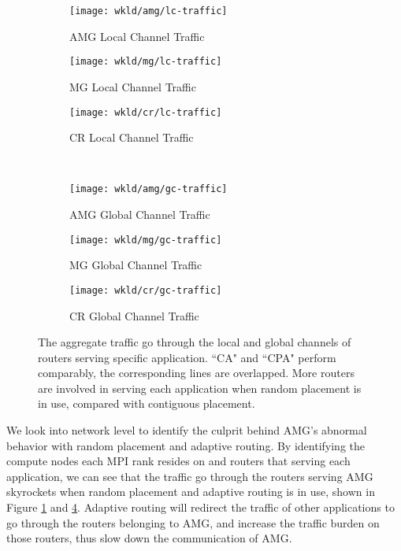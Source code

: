 \begin{figure*}[t]
    \centering
    \begin{subfigure}[t]{0.32\textwidth}
        \centering
        \texttt{[image: wkld/amg/lc-traffic]}
        \caption{AMG Local Channel Traffic}
        \label{fig:amg-lc-traffic}
    \end{subfigure}\hfill
    \hspace{1em}%
    \begin{subfigure}[t]{0.32\textwidth}
        \centering
        \texttt{[image: wkld/mg/lc-traffic]}
        \caption{MG Local Channel Traffic}
        \label{fig:mg-lc-traffic}
    \end{subfigure}\hfill
    \begin{subfigure}[t]{0.32\textwidth}
        \centering
        \texttt{[image: wkld/cr/lc-traffic]}
        \caption{CR Local Channel Traffic}
        \label{fig:cr-lc-traffic}
    \end{subfigure}\\
    \centering
    \begin{subfigure}[t]{0.32\textwidth}
        \centering
        \texttt{[image: wkld/amg/gc-traffic]}
        \caption{AMG Global Channel Traffic}
        \label{fig:amg-gc-traffic}
    \end{subfigure}\hfill
    \hspace{1em}%
    \begin{subfigure}[t]{0.32\textwidth}
        \centering
        \texttt{[image: wkld/mg/gc-traffic]}
        \caption{MG Global Channel Traffic}
        \label{fig:mg-gc-traffic}
    \end{subfigure}\hfill
    \begin{subfigure}[t]{0.32\textwidth}
        \centering
        \texttt{[image: wkld/cr/gc-traffic]}
        \caption{CR Global Channel Traffic}
        \label{fig:cr-gc-traffic}
    \end{subfigure}%
   \caption{The aggregate traffic go through the local and global channels of routers serving specific application. ``CA" and ``CPA" perform comparably, the corresponding lines are overlapped. More routers are involved in serving each application when random placement is in use, compared with contiguous placement.}
   \label{fig:3app-lc-gc-traffic}
\end{figure*}


We look into network level to identify the culprit behind AMG's abnormal behavior with random placement and adaptive routing. By identifying the compute nodes each MPI rank resides on and routers that serving each application, we can see that the traffic go through the routers serving AMG skyrockets when random placement and adaptive routing is in use, shown in Figure \ref{fig:amg-lc-traffic} and \ref{fig:amg-gc-traffic}. Adaptive routing will redirect the traffic of other applications to go through the routers belonging to AMG, and increase the traffic burden on those routers, thus slow down the communication of AMG.

